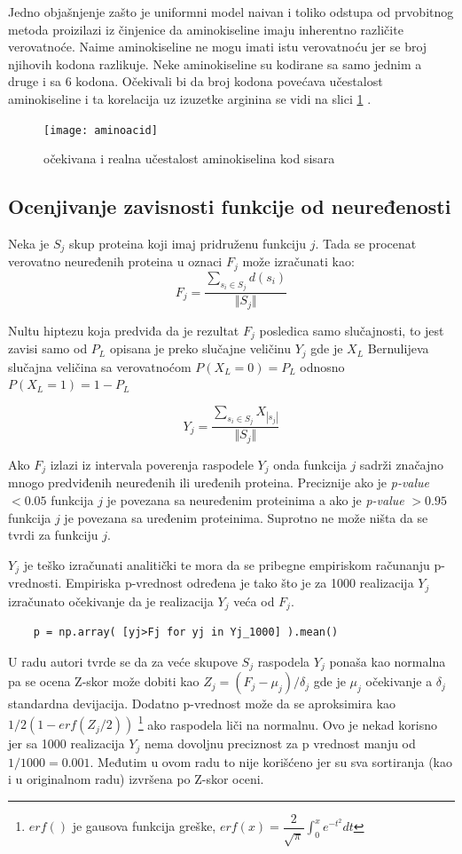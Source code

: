 Jedno objašnjenje zašto je uniformni model naivan i toliko odstupa od
prvobitnog metoda proizilazi iz činjenice da aminokiseline imaju inherentno
različite verovatnoće. Naime  aminokiseline ne mogu  imati istu
verovatnoću jer se  broj njihovih kodona razlikuje. Neke aminokiseline
su kodirane sa samo jednim a druge i sa 6 kodona. Očekivali bi da broj kodona
povećava učestalost aminokiseline i ta korelacija uz izuzetke arginina se vidi
na slici
\ref{fig:aminoacid} \parencite{AKfrekvencija}.

\begin{figure}[th]
\centering
\texttt{[image: aminoacid]}
\decoRule
\caption{očekivana i realna učestalost  aminokiselina kod sisara}
\label{fig:aminoacid}
\end{figure}



\subsection{Ocenjivanje zavisnosti funkcije od neuređenosti}

Neka je $S_j$ skup proteina koji imaj pridruženu funkciju $j$. Tada se procenat
verovatno neuređenih proteina u oznaci $F_j$ može izračunati kao: $$F_j =
\dfrac{\sum_{s_i \in S_j} d(s_i)} {\Vert S_j \Vert} $$

Nultu hiptezu koja predviđa da je rezultat $F_j$ posledica samo slučajnosti, to
jest zavisi samo od $P_L$ opisana je preko slučajne veličinu $Y_j$
gde je $X_L$ Bernulijeva slučajna veličina sa verovatnoćom $P(X_L = 0) = P_L$
odnosno $P(X_L = 1) = 1-P_L$

$$ Y_j = \dfrac {\sum_{s_i \in S_j} {X_{|s_j|}}}{\Vert S_j \Vert}$$

Ako $F_j$ izlazi iz intervala poverenja raspodele $Y_j$ onda funkcija $j$
sadrži značajno mnogo predviđenih neuređenih ili uređenih proteina. Preciznije
ako je \textit{p-value} $<0.05$ funkcija $j$ je povezana sa neuređenim
proteinima a ako je \textit{p-value} $>0.95$ funkcija $j$ je povezana sa
uređenim proteinima. Suprotno ne može ništa da se tvrdi za funkciju $j$.

$Y_j$ je teško izračunati analitički te mora da se pribegne empiriskom
računanju p-vrednosti. Empiriska p-vrednost određena je tako što je za 1000
realizacija $Y_j$ izračunato očekivanje da je realizacija $Y_j$ veća od $F_j$.
\begin{verbatim}
    p = np.array( [yj>Fj for yj in Yj_1000] ).mean()
\end{verbatim}
U radu \parencite{Xie2007} autori tvrde se da za veće skupove $S_j$ raspodela
$Y_j$ ponaša kao normalna pa se ocena Z-skor može dobiti kao
$Z_j=(F_j-\mu_j)/\delta_j$ gde je $\mu_j$ očekivanje a $\delta_j$ standardna
devijacija.  Dodatno p-vrednost može da se aproksimira kao $1/2(1-erf(Z_j/2))$
\footnote{$erf()$ je gausova funkcija greške,
$erf(x)=\dfrac{2}{\sqrt{\pi}} \int_{0}^{x}  e^{-t^2} dt$ }
ako raspodela liči na normalnu. Ovo je nekad korisno jer sa 1000 realizacija
$Y_j$ nema dovoljnu preciznost za p vrednost manju od $1/1000=0.001$. Međutim u
ovom radu to nije korišćeno jer su sva sortiranja (kao i u originalnom radu)
izvršena po Z-skor oceni.


